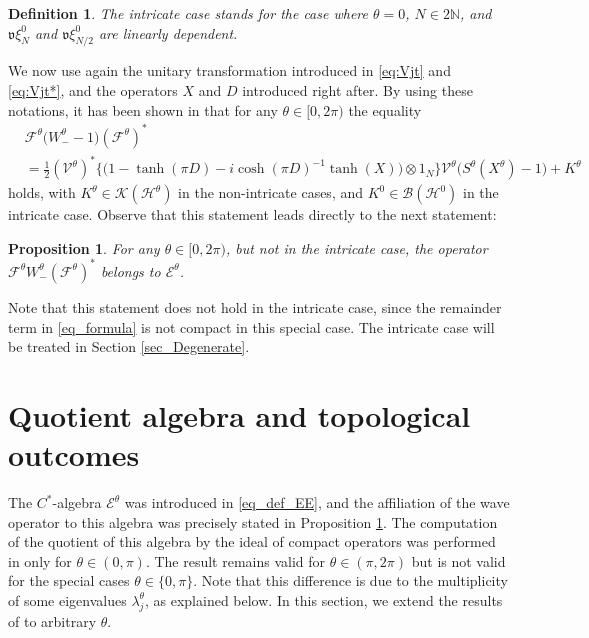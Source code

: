 \documentclass[11pt]{article}
\def\B{\mathscr B}
\def\EE{\mathscr E}
\def\F{\mathscr F}
\def\Hrond{\mathscr H}
\def\K{\mathscr K}
\def\N{\mathbb N}
\def\v{\mathfrak v}
\def\V{\mathcal V}
\newtheorem{Proposition}[Theorem]{Proposition}
\newtheorem{Definition}[Theorem]{Definition}
\begin{document}
\begin{Definition}\label{def_intricate}
The \emph{intricate case} stands for the case where $\theta=0$,
$N\in2\N$, and $\v\xi_N^0$ and $\v\xi^0_{N/2}$ are linearly dependent.
\end{Definition}

We now use again the unitary transformation introduced in \eqref{eq:Vjt}
and \eqref{eq:Vjt*}, and the operators $X$ and $D$ introduced right after.
By using these notations, it has been shown in \cite[Sec.~4.4]{NRT} that for any
$\theta\in[0,2\pi)$ the equality
\begin{align}\label{eq_formula}
\nonumber &\F^\theta\big(W_-^\theta-1\big)(\F^\theta)^* \\
& =\tfrac12(\V^{\theta})^*\big\{\big(1-\tanh(\pi D)-i\cosh(\pi D)^{-1}\tanh(X)\big)
\otimes1_N\big\}\V^\theta\big(S^\theta(X^\theta)-1\big)+K^\theta
\end{align}
holds, with $K^\theta\in\K(\Hrond^\theta)$ in the non-intricate cases, and
$K^0\in\B(\Hrond^0)$ in the intricate case.
Observe that this statement leads directly to the next statement:

\begin{Proposition}\label{prop:affiliation}
For any $\theta \in [0,2\pi)$, but not in the intricate case,
the operator
$\F^\theta W_-^\theta (\F^\theta)^*$ belongs to $\EE^\theta$.
\end{Proposition}

Note that this statement does not hold in the intricate case, since the remainder
term in \eqref{eq_formula} is not compact in this special case. The intricate
case will be treated in Section \ref{sec_Degenerate}.

\section{Quotient algebra and topological outcomes}\label{sec:C*}
\setcounter{equation}{0}

The $C^*$-algebra $\EE^\theta$ was introduced in \eqref{eq_def_EE}, 
and the affiliation of the wave
operator to this algebra was precisely stated in Proposition \ref{prop:affiliation}.
The computation of the quotient of this algebra by the ideal of compact
operators was performed in \cite{APRR} only for $\theta \in (0,\pi)$.
The result remains valid for $\theta \in (\pi,2\pi)$ but is not valid for the
special cases $\theta \in \{0,\pi\}$. Note that this difference is due to the multiplicity of some eigenvalues $\lambda_j^\theta$, as explained below. 
In this section, we extend the results of \cite{APRR} to arbitrary $\theta$.
\end{document}
